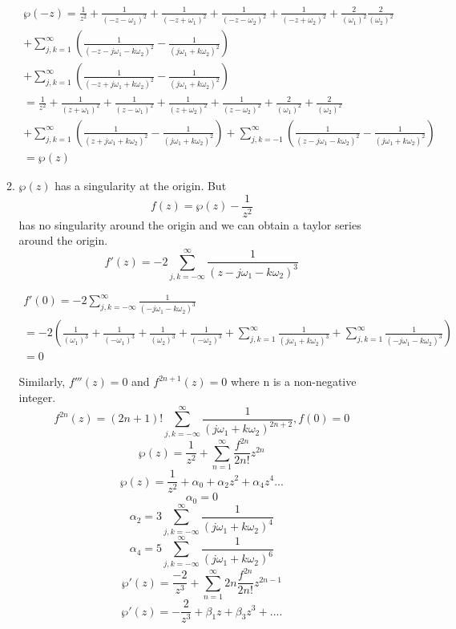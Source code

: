 \documentclass[a4paper]{article}
\begin{document}
\begin{enumerate}
\begin{enumerate}
		                         	\begin{center}             
                \begin{gather*}
   \wp(-z)		=\frac{1}{z^2}+ \frac{1}{(-z- \omega_1)^2}+ \frac{1}{(-z+ \omega_1)^2}+ \frac{1}{(-z- \omega_2)^2}+ \frac{1}{(-z+ \omega_2)^2}+ \frac{2}{( \omega_1)^2} \frac{2}{(\omega_2)^2}
		\\	+\sum_{j,k=1}^\infty \left(\frac{1}{(-z-j
				\omega_1-k \omega_2)^2}-\frac{1}{(j \omega_1+k \omega_2)^2}\right)	 \\	 + \sum_{j,k=1}^{\infty} \left(\frac{1}{(-z+j
				\omega_1+k \omega_2)^2}-\frac{1}{(j \omega_1+k \omega_2)^2}\right)		
		\\	=\frac{1}{z^2}+ \frac{1}{(z+ \omega_1)^2}+ \frac{1}{(z- \omega_1)^2}+ \frac{1}{(z+ \omega_2)^2}+ \frac{1}{(z- \omega_2)^2}+ \frac{2}{( \omega_1)^2} + \frac{2}{(\omega_2)^2}
		\\	+\sum_{j,k=1}^\infty \left(\frac{1}{(z+j
				\omega_1+k \omega_2)^2}-\frac{1}{(j \omega_1+k \omega_2)^2}\right)		+ \sum_{j,k=-1}^{\infty} \left(\frac{1}{(z-j
				\omega_1-k \omega_2)^2}-\frac{1}{(j \omega_1+k \omega_2)^2}\right)
		\\	=	   \wp(z)	
				\end{gather*} 
				\end{center}
	\item 
	$\wp(z)$ has a singularity at the origin. But
	\[ f(z) =\wp(z) - \frac{1}{z^2}	
	\] has no singularity around the origin and we can obtain a taylor series around the origin.
	\[ f'(z)= -2 \sum_{j,k=-\infty}^\infty \frac{1}{(z-j
		\omega_1-k \omega_2)^3} \]
		                         	\begin{center}             
		                         		\begin{gather*}
      f'(0)= -2  \sum_{j,k=-\infty}^\infty \frac{1}{(-j
		\omega_1-k \omega_2)^3} \\= -2 \left(\frac{1}{(\omega_1)^3}+ \frac{1}{(- \omega_1)^3}+ \frac{1}{( \omega_2)^3}+ \frac{1}{(- \omega_2)^3} 
		+\sum_{j,k=1}^\infty \frac{1}{(j
		\omega_1+k \omega_2)^3}	+ \sum_{j,k=1}^{\infty} \frac{1}{(-j
		\omega_1-k \omega_2)^3} \right)
	\\=0
	\end{gather*} 
	\end{center}
	Similarly, $f'''(z)=0$ and $f^{2n+1}(z)=0$ where n is a non-negative integer.	
	\[ f^{2n}(z) = (2n+1)! \sum_{j,k=-\infty}^\infty \frac{1}{(j
		\omega_1+k \omega_2)^{2n+2}} , f(0)=0  \]
	\[ \wp(z) = \frac{1}{z^2} + \sum_{n=1}^\infty \frac{f^{2n}}{2n!} z^{2n} \]	
		\[ \wp(z) = \frac{1}{z^2} + \alpha_0 +\alpha_2 z^2 + \alpha_4 z^4 ... \]
		\[ \alpha_0 = 0\]
		\[ \alpha_2 = 3 \sum_{j,k=-\infty}^\infty \frac{1}{(j
			\omega_1+k \omega_2)^{4}}\]
		\[ \alpha_4 = 5 \sum_{j,k=-\infty}^\infty \frac{1}{(j
			\omega_1+k \omega_2)^{6}}\]		
	\[ \wp'(z) = \frac{-2}{z^3} + \sum_{n=1}^\infty 2n \frac{f^{2n}}{2n!} z^{2n-1} \]
	\[
	\wp'(z)=-\frac{2}{z^3}+\beta_1 z+\beta_3 z^3+\ldots.
	\]


\end{enumerate}
\end{enumerate}
\end{document}
